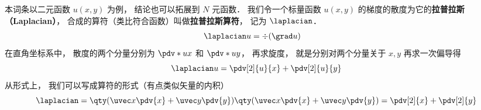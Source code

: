 

本词条以二元函数 $u(x, y)$ 为例， 结论也可以拓展到 $N$ 元函数． 我们令一个标量函数 $u(x, y)$ 的梯度的散度为它的\textbf{拉普拉斯（Laplacian）}， 合成的算符（类比符合函数）叫做\textbf{拉普拉斯算符}， 记为 $\laplacian$．
\begin{equation}
\begin{aligned}
\laplacian u &= \div (\grad u)
\end{aligned}
\end{equation}
在直角坐标系中， 散度的两个分量分别为 $\pdv*{u}{x}$ 和 $\pdv*{u}{y}$， 再求旋度， 就是分别对两个分量关于 $x, y$ 再求一次偏导得
\begin{equation}
\laplacian u = \pdv[2]{u}{x} + \pdv[2]{u}{y}
\end{equation}
从形式上， 我们可以写成算符的形式（有点类似矢量的内积）
\begin{equation}
\laplacian = \qty(\uvec x \pdv{x} + \uvec y \pdv{y}) \qty (\uvec x \pdv{x}  + \uvec y \pdv{y})
= \pdv[2]{x} + \pdv[2]{y}
\end{equation}

